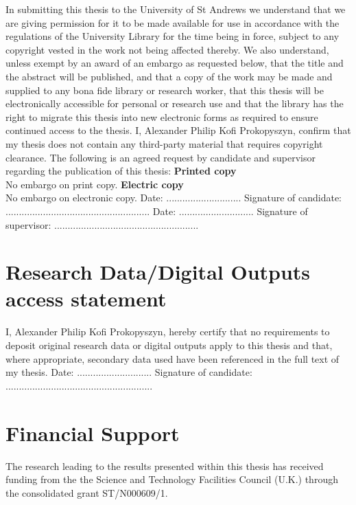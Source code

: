 \documentclass[12pt,fleqn]{report}
\numberwithin{equation}{section}
\begin{document}
In submitting this thesis to the University of St Andrews we understand that we are
giving permission for it to be made available for use in accordance with the regulations
of the University Library for the time being in force, subject to any copyright vested in
the work not being affected thereby. We also understand, unless exempt by an award
of an embargo as requested below, that the title and the abstract will be published,
and that a copy of the work may be made and supplied to any bona fide library or
research worker, that this thesis will be electronically accessible for personal or research
use and that the library has the right to migrate this thesis into new electronic forms
as required to ensure continued access to the thesis.
\vskip 0.2in
\noindent I, Alexander Philip Kofi Prokopyszyn, confirm that my thesis does not contain any third-party
material that requires copyright clearance.
\vskip 0.2in
\noindent The following is an agreed request by candidate and supervisor regarding the publication of this thesis:
\vskip 0.2in
\noindent \textbf{Printed copy} \\
\noindent No embargo on print copy.
\vskip 0.2in
\noindent \textbf{Electric copy}
\noindent \\
\noindent No embargo on electronic copy.
\vskip 0.2in
\noindent Date: ............................ \quad Signature of candidate: ......................................................
\vskip 0.2in
\noindent Date: ............................ \quad Signature of supervisor: ......................................................

\newpage

\section*{Research Data/Digital Outputs access statement}

I, Alexander Philip Kofi Prokopyszyn, hereby certify that no requirements to deposit original research data or digital outputs apply to this thesis and that, where appropriate,
secondary data used have been referenced in the full text of my thesis.
\vskip 0.2in
\noindent Date: ............................ \quad Signature of candidate: .......................................................

\vskip 0.5in

\section*{Financial Support}
The research leading to the results presented within this thesis has received funding
from the the Science and Technology Facilities Council (U.K.) through the consolidated grant ST/N000609/1.
\end{document}
